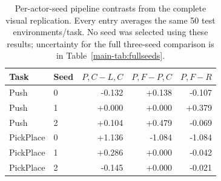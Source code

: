 \begin{table}[H]\centering\small
\caption{Per-actor-seed pipeline contrasts from the complete visual replication. Every entry averages the same 50 test environments/task. No seed was selected using these results; uncertainty for the full three-seed comparison is in Table~\ref{main-tab:fullseeds}.}\label{s-tab:seedcontrasts}
\begin{tabular}{llrrr}\toprule Task & Seed & $P,C-L,C$ & $P,F-P,C$ & $P,F-R$\\\midrule
Push & 0 & -0.132 & +0.138 & -0.107\\
Push & 1 & +0.000 & +0.000 & +0.379\\
Push & 2 & +0.104 & +0.479 & -0.069\\
PickPlace & 0 & +1.136 & -1.084 & -1.084\\
PickPlace & 1 & +0.286 & +0.000 & -0.042\\
PickPlace & 2 & -0.145 & +0.000 & -0.021\\
\bottomrule\end{tabular}\end{table}
